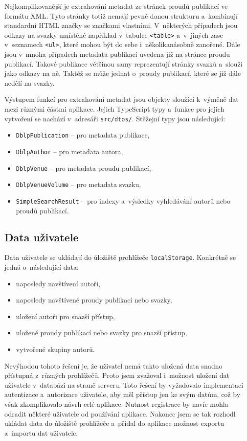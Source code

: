 \documentclass[
  biblatex,
  sourcecodes,
  glossaries,
  index
]{kidiplom}
\begin{document}
Nejkomplikovanější je extrahování metadat ze stránek proudů publikací ve formátu XML. Tyto stránky totiž nemají pevně danou strukturu a~kombinují standardní HTML značky se značkami vlastními. V~některých případech jsou odkazy na svazky umístěné například v~tabulce \texttt{<table>} a~v~jiných zase v~seznamech \texttt{<ul>}, které mohou být do sebe i~několikanásobně zanořené. Dále jsou v~mnoha případech metadata publikací uvedena již na stránce proudu publikací. Takové publikace většinou samy reprezentují stránky svazků a~slouží jako odkazy na ně. Taktéž se může jednat o~proudy publikací, které se již dále nedělí na svazky.

Výstupem funkcí pro extrahování metadat jsou objekty sloužící k~výměně dat mezi různými částmi aplikace. Jejich TypeScript typy a~funkce pro jejich vytvoření se nachází v~adresáři \texttt{src/dtos/}. Stěžejní typy jsou následující:
\begin{itemize}
\item \texttt{DblpPublication} -- pro metadata publikace,
\item \texttt{DblpAuthor} -- pro metadata autora,
\item \texttt{DblpVenue} -- pro metadata proudu publikací,
\item \texttt{DblpVenueVolume} -- pro metadata svazku,
\item \texttt{SimpleSearchResult} -- pro indexy a~výsledky vyhledávání autorů nebo proudů publikací.
\end{itemize}


\subsection{Data uživatele}

Data uživatele se ukládají do úložiště prohlížeče \texttt{localStorage}. Konkrétně se jedná o~následující data:
\begin{itemize}
\item naposledy navštívení autoři,
\item naposledy navštívené proudy publikací nebo svazky,
\item uložení autoři pro snazší přístup,
\item uložené proudy publikací nebo svazky pro snazší přístup,
\item vytvořené skupiny autorů.
\end{itemize}

Nevýhodou tohoto řešení je, že uživatel nemá takto uložená data snadno přístupná z~různých prohlížečů. Proto jsem zvažoval i~možnost uložení dat uživatele v~databázi na straně serveru. Toto řešení by vyžadovalo implementaci autentizace a~autorizace uživatele, aby měl přístup jen ke svým datům, což by však zkomplikovalo návrh celé aplikace. Nutnost registrace by navíc mohla odradit některé uživatele od používání aplikace. Nakonec jsem se tak rozhodl ukládat data do úložiště prohlížeče a~přidal do aplikace možnost exportu a~importu dat uživatele.
\end{document}
